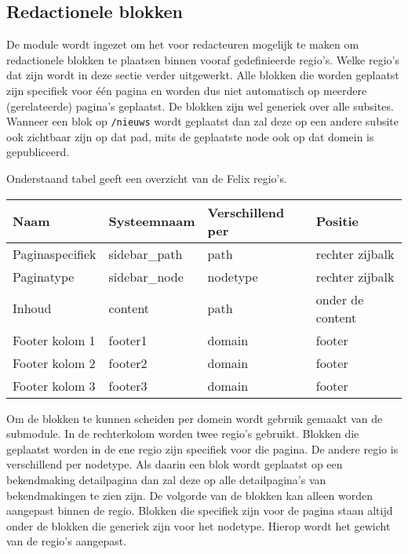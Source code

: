 \subsection{Redactionele blokken}\label{felix}

De module  wordt ingezet om het voor redacteuren mogelijk te maken om redactionele blokken te plaatsen binnen vooraf gedefinieerde regio's. Welke regio's dat zijn wordt in deze sectie verder uitgewerkt. Alle blokken die worden geplaatst zijn specifiek voor \'{e}\'{e}n pagina en worden dus niet automatisch op meerdere (gerelateerde) pagina's geplaatst. De blokken zijn wel generiek over alle subsites. Wanneer een blok op \texttt{/nieuws} wordt geplaatst dan zal deze op een andere subsite ook zichtbaar zijn op dat pad, mits de geplaatste node ook op dat domein is gepubliceerd.

Onderstaand tabel geeft een overzicht van de Felix regio's.

\begin{tabularx}{\linewidth}{| p{3cm} | p{3cm} | X | p{3cm} | }
\hline
\rowcolor{tableheader}
\textbf{Naam} & \textbf{Systeemnaam} & \textbf{Verschillend per} & \textbf{Positie} \\ \hline
Paginaspecifiek & sidebar\_path & path & rechter zijbalk \\ \hline
Paginatype & sidebar\_node & nodetype & rechter zijbalk \\ \hline
Inhoud & content & path & onder de content \\ \hline
Footer kolom 1 & footer1 & domain & footer \\ \hline
Footer kolom 2 & footer2 & domain & footer \\ \hline
Footer kolom 3 & footer3 & domain & footer \\ \hline
\end{tabularx}

Om de blokken te kunnen scheiden per domein wordt gebruik gemaakt van de  submodule. In de rechterkolom worden twee regio's gebruikt. Blokken die geplaatst worden in de ene regio zijn specifiek voor die pagina. De andere regio is verschillend per nodetype. Als daarin een blok wordt geplaatst op een bekendmaking detailpagina dan zal deze op alle detailpagina's van bekendmakingen te zien zijn. De volgorde van de blokken kan alleen worden aangepast binnen de regio. Blokken die specifiek zijn voor de pagina staan altijd onder de blokken die generiek zijn voor het nodetype. Hierop wordt het gewicht van de regio's aangepast.


